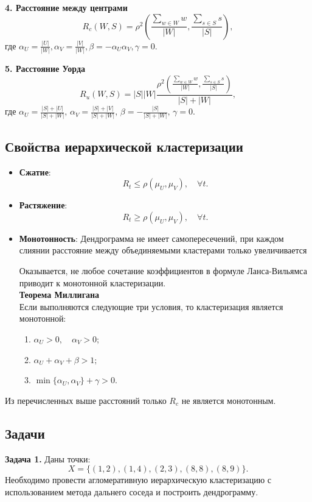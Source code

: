 \textbf{4. Расстояние между центрами}
\[
R_c(W, S) = \rho^2\left(\frac{\sum_{w \in W} w}{|W|}, \frac{\sum_{s \in S} s}{|S|}\right),
\]
где \( \alpha_U = \frac{|U|}{|W|}, \alpha_V = \frac{|V|}{|W|}, \beta = -\alpha_U\alpha_V, \gamma = 0 \).

\textbf{5. Расстояние Уорда}
\[
R_u(W, S) = |S||W|\frac{\rho^2\left(\frac{\sum_{w \in W} w}{|W|}, \frac{\sum_{s \in S} s}{|S|}\right)}{|S| + |W|},
\]
где \( \alpha_U = \frac{|S| + |U|}{|S| + |W|},\,  \alpha_V =  \frac{|S| + |V|}{|S| + |W|},\,  \beta = -\frac{|S|}{|S| + |W|},\,  \gamma = 0. \)

\subsection{Свойства иерархической кластеризации}

\begin{itemize}

    \item \textbf{Сжатие}:
    \[
R_t \leq \rho(\mu_U, \mu_V), \quad \forall t.
\]
    \item \textbf{Растяжение}:
    \[
R_t \ge \rho(\mu_U, \mu_V), \quad \forall t.
\]
    \item \textbf{Монотонность}: Дендрограмма не имеет самопересечений, при каждом слиянии расстояние между объединяемыми кластерами только увеличивается

    Оказывается, не любое сочетание коэффициентов в формуле Ланса-Вильямса приводит к монотонной кластеризации. \\
    \textbf{Теорема Миллигана} \\
    Если выполняются следующие три условия, то кластеризация является монотонной:

\begin{enumerate}
    \item \( \alpha_U > 0, \quad \alpha_V > 0; \)
    \item \( \alpha_U + \alpha_V + \beta > 1; \)
    \item  \( \min\{\alpha_U, \alpha_V\} + \gamma > 0. \)
\end{enumerate}
\end{itemize}

Из перечисленных выше расстояний только \( R_c \) не является монотонным. 

\subsection{Задачи}
\textbf{Задача 1.}
Даны точки:
\[
X = \{(1, 2), (1, 4), (2, 3), (8, 8), (8, 9)\}.
\]
Необходимо провести агломеративную иерархическую кластеризацию с использованием метода дальнего соседа и построить дендрограмму.

